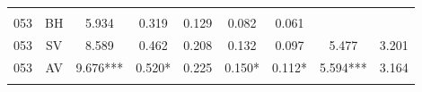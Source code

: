 \begin{table}[!htbp]
\begin{adjustbox}{width=\textwidth}
\begin{tabular}{@{\extracolsep{5pt}} Hcccccccc}
			\hline \\[-1.8ex] 
			053 & BH & 5.934 & 0.319 & 0.129 & 0.082 & 0.061 &  &  \\ 
			053 & SV & 8.589 & 0.462 & 0.208 & 0.132 & 0.097 & 5.477 & 3.201 \\ 
			053 & AV & 9.676*** & 0.520* & 0.225 & 0.150* & 0.112* & 5.594*** & 3.164 \\ 
			\hline \\[-1.8ex] 
		\end{tabular} 
	\end{adjustbox}

\end{table} 
